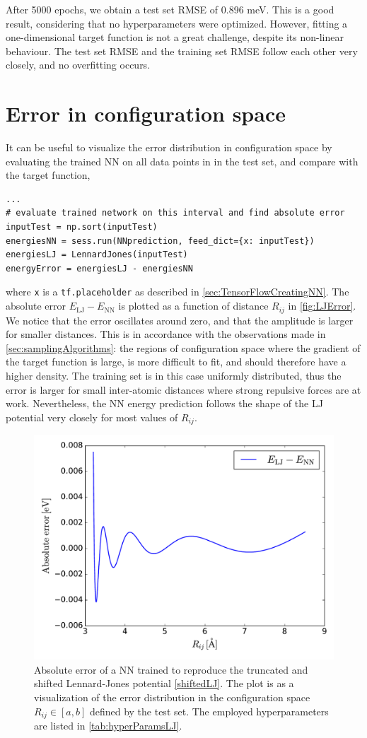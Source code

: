 \documentclass[twoside,english]{uiofysmaster}
\begin{document}
After 5000 epochs, we obtain a test set RMSE of 0.896 meV. This is a good result, considering that no hyperparameters 
were optimized. However, fitting a one-dimensional target function is not a great challenge, despite its non-linear behaviour. 
The test set RMSE and the training set RMSE follow each other very closely, and no overfitting occurs. 

\section{Error in configuration space}
It can be useful to visualize the error distribution in configuration space 
by evaluating the trained NN on all data points in in the test set, and compare with the target function, 
\begin{verbatim}
...
# evaluate trained network on this interval and find absolute error
inputTest = np.sort(inputTest)
energiesNN = sess.run(NNprediction, feed_dict={x: inputTest})
energiesLJ = LennardJones(inputTest)
energyError = energiesLJ - energiesNN
\end{verbatim}
where \texttt{x} is a \texttt{tf.placeholder} as described in \autoref{sec:TensorFlowCreatingNN}. 
The absolute error $E_\mathrm{LJ} - E_\mathrm{NN}$ is plotted as a function of distance $R_{ij}$ in \autoref{fig:LJError}.
We notice that the error oscillates around zero, and that the amplitude is larger for smaller distances.
This is in accordance with the observations made in \autoref{sec:samplingAlgorithms}: the regions of configuration space 
where the gradient of the target function is large, is more difficult to fit, and should therefore have a higher density. 
The training set is in this case uniformly distributed, thus the error is larger for small inter-atomic distances where 
strong repulsive forces are at work. Nevertheless, the NN energy prediction follows the shape of the LJ potential very closely
for most values of $R_{ij}$. 
\begin{figure}
\centering
  \includegraphics[width = 0.7\linewidth]{Figures/Implementation/LJError.pdf}
  \caption{Absolute error of a NN trained to reproduce the truncated and shifted Lennard-Jones potential \eqref{shiftedLJ}. 
           The plot is as a visualization of the error distribution in the configuration space $R_{ij} \in [a,b]$ 
           defined by the test set. The employed hyperparameters are listed in \autoref{tab:hyperParamsLJ}.} 
  \label{fig:LJError}
\end{figure}
\end{document}
